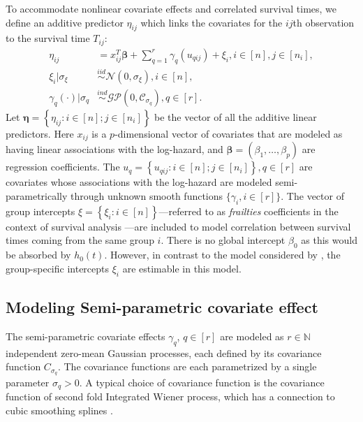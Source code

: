 \documentclass[ba]{imsart}
\begin{document}
To accommodate nonlinear covariate effects and correlated survival times, we define an additive predictor $\eta_{ij}$ which links the covariates for the $ij$th observation to the survival time $T_{ij}$:
\begin{equation}\begin{aligned}\label{eqn:eta}
\eta_{ij} &=x_{ij}^{T}\boldsymbol{\beta}+\sum_{q=1}^{r} \gamma_q(u_{qij}) +\xi_{i} , i\in[n],j\in[n_{i}], \\
\xi_i | \sigma_{\xi} &\overset{iid}{\sim} \mathcal{N}(0,\sigma_{\xi}) , i\in[n], \\
\gamma_{q}(\cdot)|\sigma_{q} &\overset{ind}{\sim} \mathcal{GP}\left(0,\mathcal{C}_{\sigma_q}\right), q\in[r].
\end{aligned}\end{equation}
Let $ \boldsymbol{\eta} = \left\{ \eta_{ij}: i \in [n]; j\in[n_{i}] \right\}$ be the vector of all the additive linear predictors. Here $x_{ij}$ is a $p$-dimensional vector of covariates that are modeled as having linear associations with the log-hazard, and $\boldsymbol{\beta} = (\beta_{1},\ldots,\beta_{p})$ are regression coefficients. The $u_{q} = \left\{u_{qij}: i \in [n]; j \in[n_{i}] \right\}, q \in [r]$ are covariates whose associations with the log-hazard are modeled semi-parametrically through unknown smooth functions $\{\gamma_i, i \in [r]\}$. The vector of group intercepts $\xi = \left\{ \xi_{i}: i \in [n] \right\}$---referred to as \textit{frailties} coefficients in the context of survival analysis \citep{frailty}---are included to model correlation between survival times coming from the same group $i$. There is no global intercept $\beta_{0}$ as this would be absorbed by $h_{0}(t)$. However, in contrast to the model considered by \cite{casecross}, the group-specific intercepts $\xi_{i}$ are estimable in this model.

\subsection{Modeling Semi-parametric covariate effect}\label{subsec:smooth}

The semi-parametric covariate effects $\gamma_q$, $q \in [r]$ are modeled as $r\in\mathbb{N}$ independent zero-mean Gaussian processes, each defined by its covariance function $C_{\sigma_{q}}$. The covariance functions are each parametrized by a single parameter $\sigma_q > 0$. A typical choice of covariance function is the covariance function of second fold Integrated Wiener process\citep{wiener}, which has a connection to cubic smoothing splines \citep{wahbaprior}.
\end{document}
